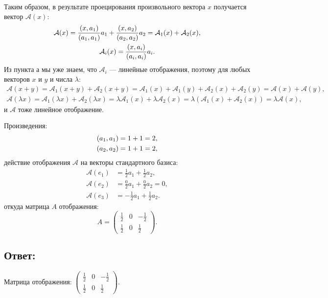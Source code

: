 \documentclass[12pt]{article}
\begin{document}
    Таким образом, в результате проецирования произвольного вектора $x$ получается вектор $\mathcal{A}(x)$:
    \begin{gather*}
        \mathcal{A}(x)
        = \frac{\left ( x, a_1 \right )}{\left ( a_1, a_1 \right )} a_1 + \frac{\left ( x, a_2 \right )}{\left ( a_2, a_2 \right )} a_2
        = \mathcal{A}_1(x) + \mathcal{A}_2(x) , \\
        \mathcal{A}_i(x) = \frac{\left ( x, a_i \right )}{\left ( a_i, a_i \right )} a_i .
    \end{gather*}
    Из пункта а мы уже знаем, что $\mathcal{A}_i$ --- линейные отображения, поэтому для любых векторов $x$ и $y$ и числа $\lambda$:
    \begin{gather*}
        \mathcal{A}(x + y)
        = \mathcal{A}_1(x + y) + \mathcal{A}_2(x + y)
        = \mathcal{A}_1(x) + \mathcal{A}_1(y) + \mathcal{A}_2(x) + \mathcal{A}_2(y)
        = \mathcal{A}(x) + \mathcal{A}(y), \\
        \mathcal{A}(\lambda x)
        = \mathcal{A}_1(\lambda x) + \mathcal{A}_2(\lambda x)
        = \lambda \mathcal{A}_1(x) + \lambda \mathcal{A}_2(x)
        = \lambda \left ( \mathcal{A}_1(x) + \mathcal{A}_2(x) \right )
        = \lambda \mathcal{A}(x),
    \end{gather*}
    и $\mathcal{A}$ тоже линейное отображение.

    Произведения:
    \begin{gather*}
        \left ( a_1, a_1 \right ) = 1 + 1 = 2, \\
        \left ( a_2, a_2 \right ) = 1 + 1 = 2 ,
    \end{gather*}
    действие отображения $\mathcal{A}$ на векторы стандартного базиса:
    \begin{align*}
        \mathcal{A}(e_1) & = \frac{1}{2} a_1 + \frac{1}{2} a_2 , \\
        \mathcal{A}(e_2) & = \frac{0}{2} a_1 + \frac{0}{2} a_2  = 0 , \\
        \mathcal{A}(e_3) & = -\frac{1}{2} a_1 + \frac{1}{2} a_2 .
    \end{align*}
    откуда матрица $A$ отображения:
    \[
        A
        =
        \begin{pmatrix}
            \frac{1}{2} & 0 & - \frac{1}{2} \\
            \frac{1}{2} & 0 & \frac{1}{2}
        \end{pmatrix}
        .
    \]

    \subsection*{Ответ:}
    Матрица отображения:
    $
    \begin{pmatrix}
        \frac{1}{2} & 0 & - \frac{1}{2} \\
        \frac{1}{2} & 0 & \frac{1}{2}
    \end{pmatrix}
    $.
\end{document}
